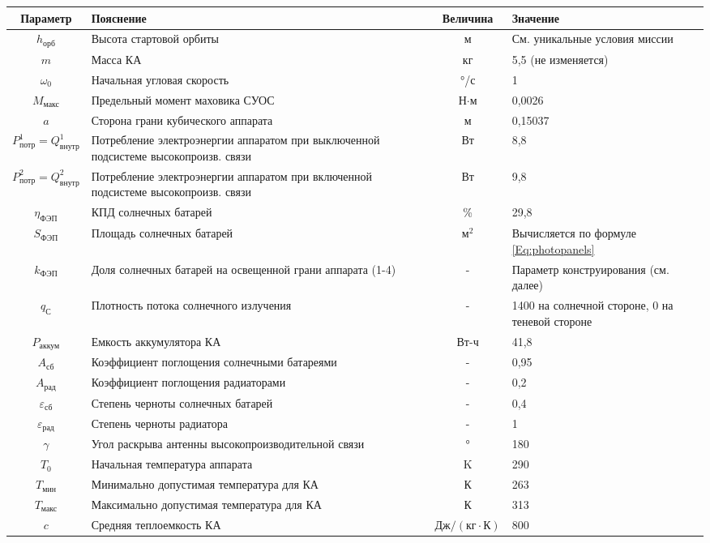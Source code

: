\documentclass[12pt,a4paper]{article}
\begin{document}
\begin{center}
\begin{longtable}{ |c|p{5cm}|c|p{5cm}| } 
  \hline
  \textbf{Параметр} & \textbf{Пояснение} & \textbf{Величина} & \textbf{Значение} \\
  \hline
  \endhead
  $h_{\text{орб}}$ & Высота стартовой орбиты & м & См. уникальные условия миссии \\
  \hline
  $m$ & Масса КА & кг & 5,5 (не изменяется)\\
  \hline
  $\omega_0$ & Начальная угловая скорость & °/с & 1\\
  \hline
  $M_{\text{макс}}$ & Предельный момент маховика СУОС & $\text{Н} \cdot \text{м}$ &
  0,0026\\
  \hline
  $a$ & Сторона грани кубического аппарата & м & 0,15037\\
  \hline
  $P^1_{\text{потр}} = Q^1_{\text{внутр}}$ & Потребление электроэнергии аппаратом при
  выключенной подсистеме высокопроизв. связи & Вт & 8,8\\
  \hline
  $P^2_{\text{потр}} = Q^2_{\text{внутр}}$ & Потребление электроэнергии аппаратом при
  включенной подсистеме высокопроизв. связи & Вт & 9,8\\
  \hline
  $\eta_{\text{ФЭП}}$ & КПД солнечных батарей & \% & 29,8\\
  \hline
  $S_{\text{ФЭП}}$ & Площадь солнечных батарей & $\text{м}^2$ & Вычисляется по формуле
  \ref{Eq:photopanels}\\
  \hline
  $k_{\text{ФЭП}}$ & Доля солнечных батарей на освещенной грани аппарата (1-4) & - &
  Параметр конструирования (см. далее)\\
  \hline
  $q_{\text{С}}$ & Плотность потока солнечного излучения & - & 1400 на солнечной стороне, 0
  на теневой стороне\\
  \hline
  $P_{\text{аккум}}$ & Емкость аккумулятора КА & Вт-ч & 41,8\\
  \hline
  $A_{\text{сб}}$ & Коэффициент поглощения солнечными батареями & - & 0,95\\
  \hline
  $A_{\text{рад}}$ & Коэффициент поглощения радиаторами & - & 0,2\\
  \hline
  $\varepsilon_{\text{сб}}$ & Степень черноты солнечных батарей & - & 0,4\\
  \hline
  $\varepsilon_{\text{рад}}$ & Степень черноты радиатора & - & 1\\
  \hline
  $\gamma$ & Угол раскрыва антенны высокопроизводительной связи & ° & 180\\
  \hline
  $T_0$ & Начальная температура аппарата & K & 290\\
  \hline
  $T_{\text{мин}}$ & Минимально допустимая температура для КА & К & 263\\
  \hline
  $T_{\text{макс}}$ & Максимально допустимая температура для КА & К & 313\\
  \hline
  $c$ & Средняя теплоемкость КА & $\text{Дж} / (\text{кг} \cdot \text{К})$ & 800\\  
  \hline
\end{longtable}
\end{center}
\end{document}
